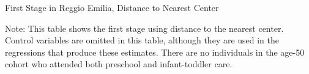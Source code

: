 \begin{table}[H]
\begin{center}
\caption{First Stage in Reggio Emilia, Distance to Nearest Center} \label{tab:dist-center}
\scalebox{0.7}{
}
\end{center}
\raggedright Note: This table shows the first stage using distance to the nearest center. Control variables are omitted in this table, although they are used in the regressions that produce these estimates. There are no individuals in the age-50 cohort who attended both preschool and infant-toddler care.
\end{table}





